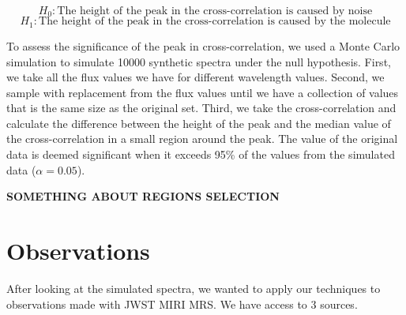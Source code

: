 \documentclass[twoside, single, authoryear, semicolon]{lion-msc}
\newcommand{\4}{$_4$}
\newcommand{\3}{$_3$}
\newcommand{\2}{$_2$}
\begin{document}
\begin{equation}
    H_0: \text{The height of the peak in the cross-correlation is caused by noise}
\end{equation}
\begin{equation}
    H_1: \text{The height of the peak in the cross-correlation is caused by the molecule}
\end{equation}

To assess the significance of the peak in cross-correlation, we used a Monte Carlo simulation to simulate 10000 synthetic spectra under the null hypothesis. First, we take all the flux values we have for different wavelength values. Second, we sample with replacement from the flux values until we have a collection of values that is the same size as the original set. Third, we take the cross-correlation and calculate the difference between the height of the peak and the median value of the cross-correlation in a small region around the peak. The value of the original data is deemed significant when it exceeds 95\% of the values from the simulated data ($\alpha=0.05$).

\textbf{SOMETHING ABOUT REGIONS SELECTION}


\section{Observations}
After looking at the simulated spectra, we wanted to apply our techniques to observations made with JWST MIRI MRS. We have access to 3 sources. 
\end{document}
